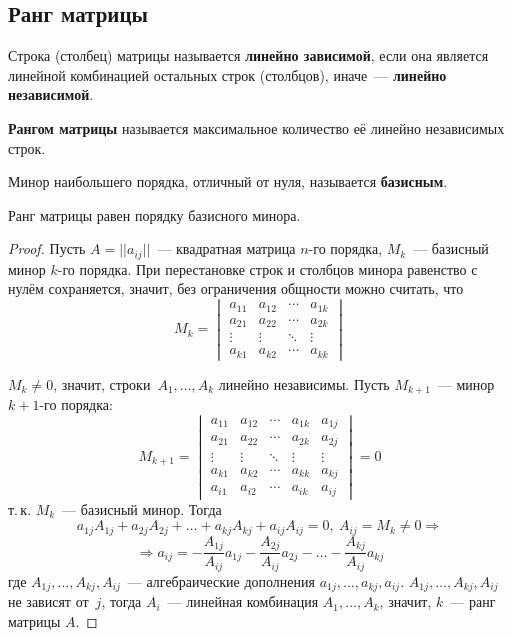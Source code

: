 \subsection{Ранг матрицы}
Строка (столбец) матрицы называется \textbf{линейно зависимой}, если она является линейной комбинацией остальных строк (столбцов), иначе~--- \textbf{линейно независимой}.

 \textbf{Рангом матрицы} называется максимальное количество её линейно независимых строк.

 Минор наибольшего порядка, отличный от нуля, называется \textbf{базисным}.

\begin{theorem}
Ранг матрицы равен порядку базисного минора.
\end{theorem}
\begin{proof}
Пусть $A = ||a_{ij}||$~--- квадратная матрица $n$-го порядка, $M_k$~--- базисный минор $k$\nobreakdash-го порядка.
При перестановке строк и столбцов минора равенство с нулём сохраняется, значит, без ограничения общности можно считать, что
\begin{equation*}
M_k =
\begin{vmatrix}
a_{11} & a_{12} & \cdots & a_{1k} \\
a_{21} & a_{22} & \cdots & a_{2k} \\
\vdots & \vdots & \ddots & \vdots \\
a_{k1} & a_{k2} & \cdots & a_{kk}
\end{vmatrix}
\end{equation*}

$M_k \neq 0$, значит, строки~$A_1, \ldots, A_k$ линейно независимы. Пусть $M_{k+1}$~--- минор $k + 1$\nobreakdash-го порядка:
\begin{equation*}
M_{k+1} =
\begin{vmatrix}
a_{11} & a_{12} & \cdots & a_{1k} & a_{1j} \\
a_{21} & a_{22} & \cdots & a_{2k} & a_{2j} \\
\vdots & \vdots & \ddots & \vdots & \vdots \\
a_{k1} & a_{k2} & \cdots & a_{kk} & a_{kj} \\
a_{i1} & a_{i2} & \cdots & a_{ik} & a_{ij}
\end{vmatrix} = 0
\end{equation*}
т.\,к. $M_k$~--- базисный минор.
Тогда
\begin{equation*}
a_{1j} A_{1j} + a_{2j} A_{2j} + \ldots + a_{kj} A_{kj} + a_{ij} A_{ij} = 0, \ A_{ij} = M_k \neq 0 \Rightarrow
\end{equation*}
\begin{equation*}
\Rightarrow a_{ij} = -\frac{A_{1j}}{A_{ij}} a_{1j} - \frac{A_{2j}}{A_{ij}} a_{2j} - \ldots - \frac{A_{kj}}{A_{ij}} a_{kj}
\end{equation*}
где $A_{1j}, \ldots, A_{kj}, A_{ij}$~--- алгебраические дополнения $a_{1j}, \ldots, a_{kj}, a_{ij}$.
$A_{1j}, \ldots, A_{kj}, A_{ij}$ не зависят от~$j$, тогда $A_i$~--- линейная комбинация $A_1, \ldots, A_k$, значит, $k$~--- ранг матрицы $A$.
\end{proof}

